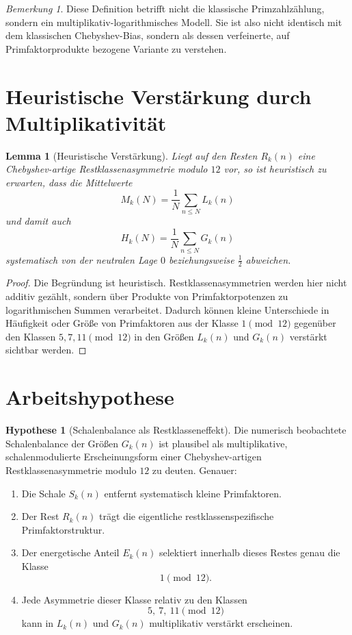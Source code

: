 \documentclass[11pt,a4paper]{article}
\newtheorem{lemma}[satz]{Lemma}
\theoremstyle{definition}
\newtheorem{hypothese}[satz]{Hypothese}
\theoremstyle{remark}
\newtheorem{bemerkung}[satz]{Bemerkung}
\begin{document}
	\begin{bemerkung}
		Diese Definition betrifft nicht die klassische Primzahlzählung, sondern ein
		multiplikativ-logarithmisches Modell. Sie ist also nicht identisch mit dem klassischen
		Chebyshev-Bias, sondern als dessen verfeinerte, auf Primfaktorprodukte bezogene Variante zu
		verstehen.
	\end{bemerkung}
	
	\section{Heuristische Verstärkung durch Multiplikativität}
	
	\begin{lemma}[Heuristische Verstärkung]
		Liegt auf den Resten \(R_k(n)\) eine Chebyshev-artige Restklassenasymmetrie modulo \(12\) vor,
		so ist heuristisch zu erwarten, dass die Mittelwerte
		\[
		M_k(N)=\frac{1}{N}\sum_{n\le N}L_k(n)
		\]
		und damit auch
		\[
		H_k(N)=\frac{1}{N}\sum_{n\le N}G_k(n)
		\]
		systematisch von der neutralen Lage \(0\) beziehungsweise \(\frac12\) abweichen.
	\end{lemma}
	
	\begin{proof}
		Die Begründung ist heuristisch. Restklassenasymmetrien werden hier nicht additiv gezählt,
		sondern über Produkte von Primfaktorpotenzen zu logarithmischen Summen verarbeitet. Dadurch
		können kleine Unterschiede in Häufigkeit oder Größe von Primfaktoren aus der Klasse
		\(1 \pmod{12}\) gegenüber den Klassen \(5,7,11 \pmod{12}\) in den Größen \(L_k(n)\) und
		\(G_k(n)\) verstärkt sichtbar werden.
	\end{proof}
	
	\section{Arbeitshypothese}
	
	\begin{hypothese}[Schalenbalance als Restklasseneffekt]
		Die numerisch beobachtete Schalenbalance der Größen \(G_k(n)\) ist plausibel als
		multiplikative, schalenmodulierte Erscheinungsform einer Chebyshev-artigen
		Restklassenasymmetrie modulo \(12\) zu deuten. Genauer:
		\begin{enumerate}
			\item Die Schale \(S_k(n)\) entfernt systematisch kleine Primfaktoren.
			\item Der Rest \(R_k(n)\) trägt die eigentliche restklassenspezifische Primfaktorstruktur.
			\item Der energetische Anteil \(E_k(n)\) selektiert innerhalb dieses Restes genau die Klasse
			\[
			1\pmod{12}.
			\]
			\item Jede Asymmetrie dieser Klasse relativ zu den Klassen
			\[
			5,\ 7,\ 11 \pmod{12}
			\]
			kann in \(L_k(n)\) und \(G_k(n)\) multiplikativ verstärkt erscheinen.
		\end{enumerate}
	\end{hypothese}
	
\end{document}
